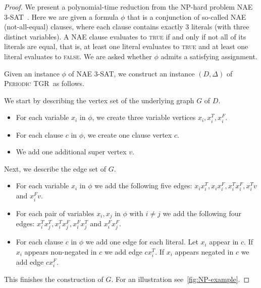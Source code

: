 \documentclass[a4paper,UKenglish,cleveref, autoref, thm-restate]{lipics-v2021}
\newcommand{\deltaExact}{\textsc{Periodic TGR}}
\begin{document}
\begin{proof}
	We present a polynomial-time reduction from the NP-hard problem NAE 3-SAT~\cite{Schaefer1978complexity}. Here we are given a formula $\phi$ that is a conjunction of so-called NAE (not-all-equal) clauses, where each clause contains exactly 3 literals (with three distinct variables).
    A NAE clause evaluates to \textsc{true} if and only if not all of its literals are equal, that is, at least one literal evaluates to \textsc{true} and at least one literal evaluates to \textsc{false}.
    We are asked whether $\phi$ admits a satisfying assignment. 

    
    Given an instance $\phi$ of NAE 3-SAT, we construct an instance $(D,\Delta)$ of \deltaExact\ as follows.

 We start by describing the vertex set of the underlying graph $G$ of $D$.
\begin{itemize}
\item For each variable $x_i$ in $\phi$, we create three variable vertices $x_i, x_i^T, x_i^F$.
\item For each clause $c$ in $\phi$, we create one clause vertex $c$.
\item We add one additional super vertex $v$.
\end{itemize}
Next, we describe the edge set of $G$.
\begin{itemize}
\item For each variable $x_i$ in $\phi$ we add the following five edges: 
$x_i x_i^T, x_i x_i^F, x_i^T x_i^F, x_i^T v$ and $ x_i^Fv$.
\item For each pair of variables $x_i,x_j$ in $\phi$ with $i \neq j$ we add the following four edges: 
$x_i^T x_j^T, x_i^Tx_j^F, x_i^Fx_j^T$ and $x_i^Fx_j^F$.
\item For each clause $c$ in $\phi$ we add one edge for each literal. Let $x_i$ appear in $c$. If $x_i$ appears non-negated in $c$ we add edge $c x_i^T$. 
If $x_i$ appears negated in $c$ we add edge $c x_i^F$.
\end{itemize}
This finishes the construction of $G$.
For an illustration see~\cref{fig:NP-example}.


\end{proof}
\end{document}
